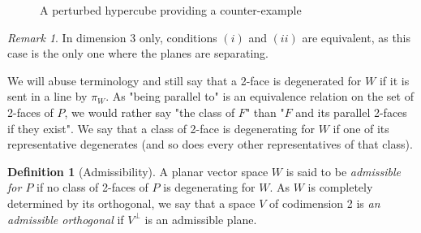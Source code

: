 \documentclass[12pt, notitlepage]{article}
\theoremstyle{plain}
\theoremstyle{definition}
\newtheorem{defin}{Definition}
\theoremstyle{plain}
\theoremstyle{remark}
\newtheorem*{rmk}{Remark}
\theoremstyle{plain}
\theoremstyle{plain}
\begin{document}
\begin{figure}[ht]
    \caption{A perturbed hypercube providing a counter-example}
    \label{perturbed hypercube}
\end{figure}

\begin{rmk}
In dimension 3 only, conditions $(i)$ and $(ii)$ are equivalent, as this case is the only one where the planes are separating.
\end{rmk}

We will abuse terminology and still say that a 2-face is degenerated for $W$ if it is sent in a line by $\pi_W$. As "being parallel to" is an equivalence relation on the set of 2-faces of $P$, we would rather say "the class of $F$" than "$F$ and its parallel 2-faces if they exist". We say that a class of 2-face is degenerating for $W$ if one of its representative degenerates (and so does every other representatives of that class).

\begin{defin}[Admissibility] \label{admissible}
A planar vector space $W$ is said to be \emph{admissible for $P$} if no class of 2-faces of $P$ is degenerating for $W$. As $W$ is completely determined by its orthogonal, we say that a space $V$ of codimension 2 is  \emph{an admissible orthogonal} if $V^\perp$ is an admissible plane.
\end{defin}
\end{document}
